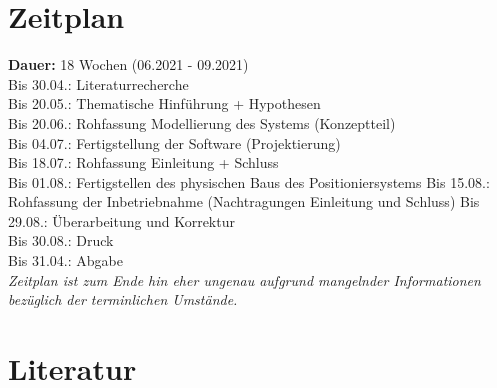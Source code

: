 \documentclass[12pt, a4paper, twoside]{article} %
\begin{document}
\section{Zeitplan}
\textbf{Dauer:} 18 Wochen (06.2021 - 09.2021)\\
Bis 30.04.: Literaturrecherche\\
Bis 20.05.: Thematische Hinführung + Hypothesen\\
Bis 20.06.: Rohfassung Modellierung des Systems (Konzeptteil)\\
Bis 04.07.: Fertigstellung der Software (Projektierung)\\
Bis 18.07.: Rohfassung Einleitung + Schluss\\
Bis 01.08.: Fertigstellen des physischen Baus des Positioniersystems
Bis 15.08.: Rohfassung der Inbetriebnahme (Nachtragungen Einleitung und Schluss)
Bis 29.08.: Überarbeitung und Korrektur\\
Bis 30.08.: Druck \\
Bis 31.04.: Abgabe\\
\textit{Zeitplan ist zum Ende hin eher ungenau aufgrund mangelnder Informationen bezüglich der terminlichen Umstände.}

\newpage
\section*{Literatur}

\nocite{Winkelhake2021}
\nocite{Geisberger2012}
\nocite{Bauernhansl2014}
\nocite{Pistorius2020}

\printbibliography[
	heading=subbibintoc,
	type=book,
	title={Bücher}
]
	

\nocite{Wissenschaft2013}

\printbibliography[
	heading=subbibintoc,
	type=article,
	title={Artikel}
]
\end{document}

